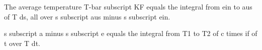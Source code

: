 The average temperature T-bar subscript KF equals the integral from ein to aus of T ds, all over s subscript aus minus s subscript ein.

s subscript a minus s subscript e equals the integral from T1 to T2 of c times if of t over T dt.